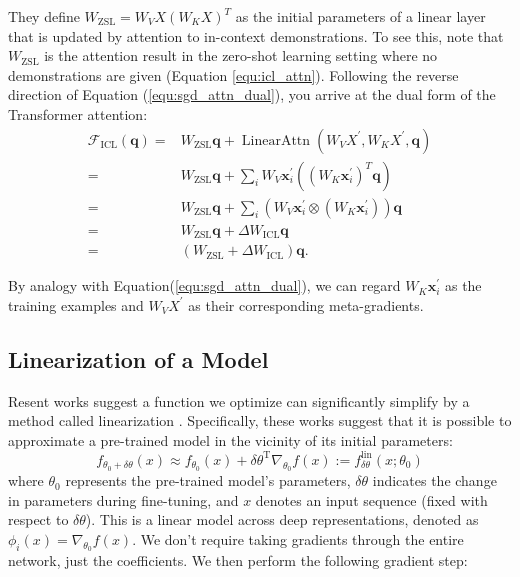 They define $W_{\text{ZSL}} = W_{V} X \left( W_{K} X \right)^T$ as the initial parameters of a linear layer that is updated by attention to in-context demonstrations.
To see this, note that $W_{\text{ZSL}}$ is the attention result in the zero-shot learning setting where no demonstrations are given (Equation \ref{equ:icl_attn}). 
Following the reverse direction of Equation (\ref{equ:sgd_attn_dual}), you arrive at the dual form of the Transformer attention: 
\begin{equation}
    \begin{aligned}
        \mathcal{F}_{\text{ICL}}(\mathbf{q})
        = & W_{\text{ZSL}} \mathbf{q} + \operatorname{LinearAttn} \left( W_{V} X^{\prime}, W_{K} X^{\prime}, \mathbf{q} \right) \\
        = & W_{\text{ZSL}} \mathbf{q} + \sum_i W_{V} \textbf{x}^{\prime}_i \left( \left( W_{K} \textbf{x}^{\prime}_i \right)^T \mathbf{q} \right) \\
        = & W_{\text{ZSL}} \mathbf{q} + \sum_i \left( W_{V} \textbf{x}^{\prime}_i \otimes \left( W_{K} \textbf{x}^{\prime}_i \right) \right) \mathbf{q} \\
        = & W_{\text{ZSL}} \mathbf{q} + \Delta W_{\text{ICL}} \mathbf{q} \\
        = & \left( W_{\text{ZSL}} + \Delta W_{\text{ICL}} \right) \mathbf{q}. 
    \end{aligned}
    \label{equ:icl_opti_dual}
\end{equation}

By analogy with Equation(\ref{equ:sgd_attn_dual}), we can regard $W_{K} \textbf{x}^{\prime}_i$ as the training examples and $W_{V} X^{\prime}$ as their corresponding meta-gradients. 

\subsection{Linearization of a Model}
Resent works suggest a function we optimize can significantly simplify by a method called linearization \cite{10.5555/3454287.3455056, linearization23}.
Specifically, these works suggest that it is possible to approximate a pre-trained model in the vicinity of its initial parameters:
\begin{equation}
    f_{\theta_0 + \delta \theta}(x) \approx f_{\theta_0}(x) + \delta \theta^\textrm{T} \nabla_{\theta_0} f(x) := f_{\delta \theta}^{\textrm{lin}}(x; \theta_0)
\end{equation}
where $\theta_0$ represents the pre-trained model's parameters, $\delta \theta$ indicates the change in parameters during fine-tuning, and $x$ denotes an input sequence (fixed with respect to $\delta \theta$).
This is a linear model across deep representations, denoted as $\phi_i(x) = \nabla_{\theta_0} f(x)$. We don’t require taking gradients through the entire network, just the coefficients. We then perform the following gradient step:

